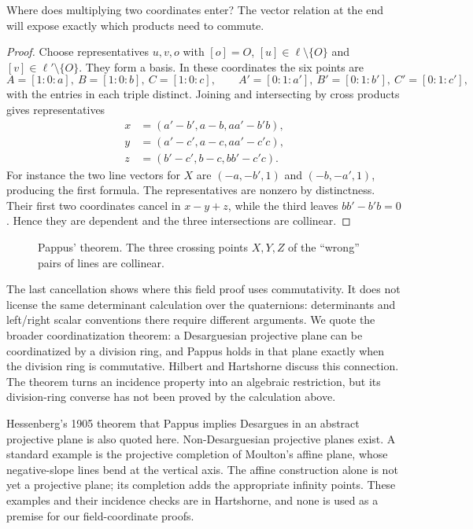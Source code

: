 \begin{think}
Where does multiplying two coordinates enter? The vector relation at the end will expose exactly which products need to commute.
\end{think}

\begin{proof}
Choose representatives $u,v,o$ with $[o]=O$, $[u]\in\ell\setminus\{O\}$ and $[v]\in\ell'\setminus\{O\}$. They form a basis. In these coordinates the six points are
\[
A=[1:0:a],\ B=[1:0:b],\ C=[1:0:c],\qquad
A'=[0:1:a'],\ B'=[0:1:b'],\ C'=[0:1:c'],
\]
with the entries in each triple distinct. Joining and intersecting by cross products gives representatives
\[
\begin{aligned}
x&=(a'-b',a-b,aa'-b'b),\\
y&=(a'-c',a-c,aa'-c'c),\\
z&=(b'-c',b-c,bb'-c'c).
\end{aligned}
\]
For instance the two line vectors for $X$ are $(-a,-b',1)$ and $(-b,-a',1)$, producing the first formula. The representatives are nonzero by distinctness. Their first two coordinates cancel in $x-y+z$, while the third leaves $bb'-b'b=0$. Hence they are dependent and the three intersections are collinear.
\end{proof}

\begin{figure}[ht]
\centering
{}
\caption{Pappus' theorem. The three crossing points $X,Y,Z$ of the ``wrong'' pairs of lines are collinear.}
\label{geometry:fig:pappus4}
\end{figure}

\begin{beauty}
The last cancellation shows where this field proof uses commutativity. It does not license the same determinant calculation over the quaternions: determinants and left/right scalar conventions there require different arguments. We quote the broader coordinatization theorem: a Desarguesian projective plane can be coordinatized by a division ring, and Pappus holds in that plane exactly when the division ring is commutative. Hilbert and Hartshorne discuss this connection. The theorem turns an incidence property into an algebraic restriction, but its division-ring converse has not been proved by the calculation above.
\end{beauty}

\begin{remark}
Hessenberg's 1905 theorem that Pappus implies Desargues in an abstract projective plane is also quoted here. Non-Desarguesian projective planes exist. A standard example is the projective completion of Moulton's affine plane, whose negative-slope lines bend at the vertical axis. The affine construction alone is not yet a projective plane; its completion adds the appropriate infinity points. These examples and their incidence checks are in Hartshorne, and none is used as a premise for our field-coordinate proofs.
\end{remark}

